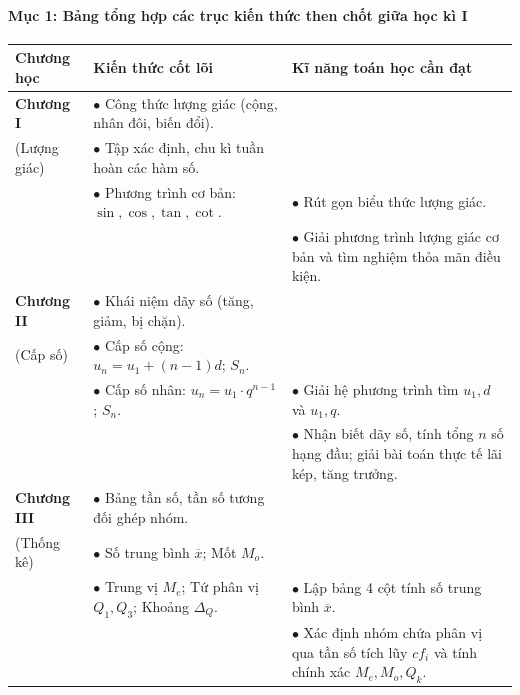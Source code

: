 \documentclass[12pt, a4paper]{article}
\begin{document}
\paragraph{Mục 1: Bảng tổng hợp các trục kiến thức then chốt giữa học kì I}

\begin{center}
\begin{tabularx}{\linewidth}{|l|X|X|}
\hline
\textbf{Chương học} & \textbf{Kiến thức cốt lõi} & \textbf{Kĩ năng toán học cần đạt} \\
\hline
\textbf{Chương I} & $\bullet$ Công thức lượng giác (cộng, nhân đôi, biến đổi).\\
(Lượng giác) & $\bullet$ Tập xác định, chu kì tuần hoàn các hàm số.\\
& $\bullet$ Phương trình cơ bản: $\sin, \cos, \tan, \cot$. & $\bullet$ Rút gọn biểu thức lượng giác.\\
& & $\bullet$ Giải phương trình lượng giác cơ bản và tìm nghiệm thỏa mãn điều kiện. \\
\hline
\textbf{Chương II} & $\bullet$ Khái niệm dãy số (tăng, giảm, bị chặn).\\
(Cấp số) & $\bullet$ Cấp số cộng: $u_n = u_1 + (n - 1)d$; $S_n$.\\
& $\bullet$ Cấp số nhân: $u_n = u_1 \cdot q^{n-1}$; $S_n$. & $\bullet$ Giải hệ phương trình tìm $u_1, d$ và $u_1, q$.\\
& & $\bullet$ Nhận biết dãy số, tính tổng $n$ số hạng đầu; giải bài toán thực tế lãi kép, tăng trưởng. \\
\hline
\textbf{Chương III} & $\bullet$ Bảng tần số, tần số tương đối ghép nhóm.\\
(Thống kê) & $\bullet$ Số trung bình $\overline{x}$; Mốt $M_o$.\\
& $\bullet$ Trung vị $M_e$; Tứ phân vị $Q_1, Q_3$; Khoảng $\Delta_Q$. & $\bullet$ Lập bảng 4 cột tính số trung bình $\overline{x}$.\\
& & $\bullet$ Xác định nhóm chứa phân vị qua tần số tích lũy $cf_i$ và tính chính xác $M_e, M_o, Q_k$. \\
\hline
\end{tabularx}
\end{center}
\end{document}

